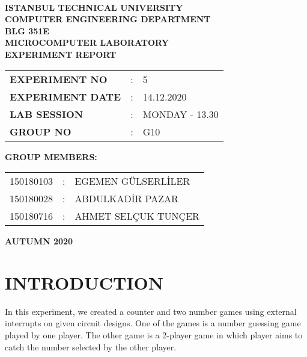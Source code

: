 \documentclass[pdftex,12pt,a4paper]{article}
\begin{document}
\begin{titlepage}
\begin{center}
\textbf{}\\
\textbf{\Large{ISTANBUL TECHNICAL UNIVERSITY}}\\
\vspace{0.5cm}
\textbf{\Large{COMPUTER ENGINEERING DEPARTMENT}}\\
\vspace{2cm}
\textbf{\Large{BLG 351E\\ MICROCOMPUTER LABORATORY\\ EXPERIMENT REPORT}}\\
\vspace{2.8cm}
\begin{table}[ht]
\centering
\Large{
\begin{tabular}{lcl}
\textbf{EXPERIMENT NO}  & : & 5 \\
\textbf{EXPERIMENT DATE}  & : & 14.12.2020 \\
\textbf{LAB SESSION}  & : & MONDAY - 13.30 \\
\textbf{GROUP NO}  & : & G10 \\
\end{tabular}}
\end{table}
\vspace{1cm}
\textbf{\Large{GROUP MEMBERS:}}\\
\begin{table}[ht]
\centering
\Large{
\begin{tabular}{rcl}
150180103  & : & EGEMEN GÜLSERLİLER \\
150180028  & : & ABDULKADİR PAZAR \\
150180716  & : & AHMET SELÇUK TUNÇER \\
\end{tabular}}
\end{table}
\vspace{2.8cm}
\textbf{\Large{AUTUMN 2020}}

\end{center}

\end{titlepage}

\thispagestyle{empty}
\setcounter{tocdepth}{4}
\tableofcontents
\clearpage

\setcounter{page}{1}

\section{INTRODUCTION}
In this experiment, we created a counter and two number games using external interrupts on given circuit designs. One of the games is a number guessing game played by one player. The other game is a 2-player game in which player aims to catch the number selected by the other player.
\end{document}
